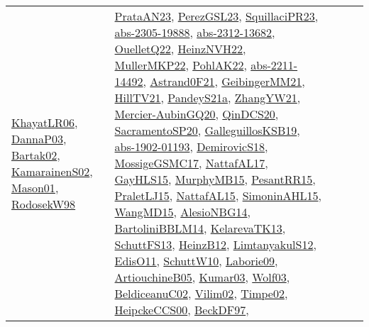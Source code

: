 {\begin{longtable}{llp{6cm}p{6cm}p{6cm}}
\href{articles/KhayatLR06.pdf}{KhayatLR06}\cite{KhayatLR06}, \href{papers/DannaP03.pdf}{DannaP03}\cite{DannaP03}, \href{papers/Bartak02.pdf}{Bartak02}\cite{Bartak02}, \href{papers/KamarainenS02.pdf}{KamarainenS02}\cite{KamarainenS02}, \href{articles/Mason01.pdf}{Mason01}\cite{Mason01}, \href{papers/RodosekW98.pdf}{RodosekW98}\cite{RodosekW98} & \href{articles/PrataAN23.pdf}{PrataAN23}\cite{PrataAN23}, \href{papers/PerezGSL23.pdf}{PerezGSL23}\cite{PerezGSL23}, \href{papers/SquillaciPR23.pdf}{SquillaciPR23}\cite{SquillaciPR23}, \href{articles/abs-2305-19888.pdf}{abs-2305-19888}\cite{abs-2305-19888}, \href{articles/abs-2312-13682.pdf}{abs-2312-13682}\cite{abs-2312-13682}, \href{papers/OuelletQ22.pdf}{OuelletQ22}\cite{OuelletQ22}, \href{articles/HeinzNVH22.pdf}{HeinzNVH22}\cite{HeinzNVH22}, \href{articles/MullerMKP22.pdf}{MullerMKP22}\cite{MullerMKP22}, \href{articles/PohlAK22.pdf}{PohlAK22}\cite{PohlAK22}, \href{articles/abs-2211-14492.pdf}{abs-2211-14492}\cite{abs-2211-14492}, \href{papers/Astrand0F21.pdf}{Astrand0F21}\cite{Astrand0F21}, \href{papers/GeibingerMM21.pdf}{GeibingerMM21}\cite{GeibingerMM21}, \href{papers/HillTV21.pdf}{HillTV21}\cite{HillTV21}, \href{articles/PandeyS21a.pdf}{PandeyS21a}\cite{PandeyS21a}, \href{articles/ZhangYW21.pdf}{ZhangYW21}\cite{ZhangYW21}, \href{papers/Mercier-AubinGQ20.pdf}{Mercier-AubinGQ20}\cite{Mercier-AubinGQ20}, \href{articles/QinDCS20.pdf}{QinDCS20}\cite{QinDCS20}, \href{articles/SacramentoSP20.pdf}{SacramentoSP20}\cite{SacramentoSP20}, \href{papers/GalleguillosKSB19.pdf}{GalleguillosKSB19}\cite{GalleguillosKSB19}, \href{articles/abs-1902-01193.pdf}{abs-1902-01193}\cite{abs-1902-01193}, \href{papers/DemirovicS18.pdf}{DemirovicS18}\cite{DemirovicS18}, \href{papers/MossigeGSMC17.pdf}{MossigeGSMC17}\cite{MossigeGSMC17}, \href{articles/NattafAL17.pdf}{NattafAL17}\cite{NattafAL17}, \href{papers/GayHLS15.pdf}{GayHLS15}\cite{GayHLS15}, \href{papers/MurphyMB15.pdf}{MurphyMB15}\cite{MurphyMB15}, \href{papers/PesantRR15.pdf}{PesantRR15}\cite{PesantRR15}, \href{papers/PraletLJ15.pdf}{PraletLJ15}\cite{PraletLJ15}, \href{articles/NattafAL15.pdf}{NattafAL15}\cite{NattafAL15}, \href{articles/SimoninAHL15.pdf}{SimoninAHL15}\cite{SimoninAHL15}, \href{articles/WangMD15.pdf}{WangMD15}\cite{WangMD15}, \href{papers/AlesioNBG14.pdf}{AlesioNBG14}\cite{AlesioNBG14}, \href{papers/BartoliniBBLM14.pdf}{BartoliniBBLM14}\cite{BartoliniBBLM14}, \href{papers/KelarevaTK13.pdf}{KelarevaTK13}\cite{KelarevaTK13}, \href{papers/SchuttFS13.pdf}{SchuttFS13}\cite{SchuttFS13}, \href{papers/HeinzB12.pdf}{HeinzB12}\cite{HeinzB12}, \href{articles/LimtanyakulS12.pdf}{LimtanyakulS12}\cite{LimtanyakulS12}, \href{papers/EdisO11.pdf}{EdisO11}\cite{EdisO11}, \href{papers/SchuttW10.pdf}{SchuttW10}\cite{SchuttW10}, \href{papers/Laborie09.pdf}{Laborie09}\cite{Laborie09}, \href{papers/ArtiouchineB05.pdf}{ArtiouchineB05}\cite{ArtiouchineB05}, \href{papers/Kumar03.pdf}{Kumar03}\cite{Kumar03}, \href{papers/Wolf03.pdf}{Wolf03}\cite{Wolf03}, \href{papers/BeldiceanuC02.pdf}{BeldiceanuC02}\cite{BeldiceanuC02}, \href{papers/Vilim02.pdf}{Vilim02}\cite{Vilim02}, \href{articles/Timpe02.pdf}{Timpe02}\cite{Timpe02}, \href{articles/HeipckeCCS00.pdf}{HeipckeCCS00}\cite{HeipckeCCS00}, \href{papers/BeckDF97.pdf}{BeckDF97}\cite{BeckDF97}, 
\end{longtable}}
